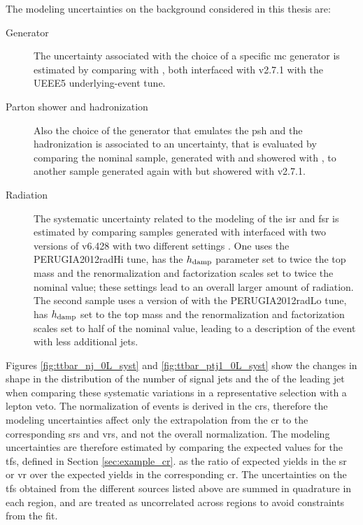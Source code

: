 The modeling uncertainties on the \ttbar background considered in this thesis are:
\begin{description}
\item[Generator] The uncertainty associated with the choice of a specific \gls{mc} generator is estimated by comparing \PowhegBox with \aNLO, both interfaced with \HWpp v2.7.1 with the UEEE5 underlying-event tune.

\item[Parton shower and hadronization] Also the choice of the generator that emulates the \gls{psh} and the hadronization is associated to an uncertainty, that is evaluated by comparing the nominal sample, generated with \PowhegBox and showered with \PY, to another sample generated again with \PowhegBox but showered with \HWpp v2.7.1. 

\item[Radiation] The systematic uncertainty related to the modeling of the \gls{isr} and \gls{fsr} is estimated by comparing samples
generated with \PowhegBox interfaced with two versions of \PY v6.428 with two different settings \cite{Skands:2010ak}. 
One uses the PERUGIA2012radHi tune, has the $h_{\rm{damp}}$ parameter set to twice the top mass and the renormalization and factorization scales set to twice the nominal value; these settings lead to an overall larger amount of radiation. The second sample uses a version of \PY with the PERUGIA2012radLo tune, has $h_{\rm{damp}}$ set to the top mass and the renormalization and factorization scales set to half of the nominal value, leading to a description of the event with less additional jets.

\end{description}

Figures \ref{fig:ttbar_nj_0L_syst} and \ref{fig:ttbar_ptj1_0L_syst} show the changes in shape in the distribution of the number of signal jets and the \pt of the leading jet when comparing these systematic variations in a representative selection with a lepton veto.
The normalization of \ttbar events is derived in the \glspl{cr}, therefore the modeling uncertainties affect only the extrapolation from 
the \gls{cr} to the corresponding \glspl{sr} and \glspl{vr}, and not the overall normalization. 
The modeling uncertainties are therefore estimated by comparing the expected values for the \glspl{tf}, defined in Section \ref{sec:example_cr}.
as the ratio of expected yields in the \gls{sr} or \gls{vr} over the expected yields in the corresponding \gls{cr}. 
The uncertainties on the \glspl{tf} obtained from the different sources listed above are summed in quadrature in each region, and are treated as uncorrelated across regions to avoid 
constraints from the fit. 


